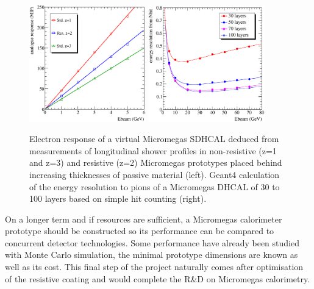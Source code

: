 \begin{figure}[hbp]
\begin{centering}
\includegraphics[width=0.45\textwidth]{Calorimeter/SDHCAL/splam_linearity}
\includegraphics[width=0.45\textwidth]{Calorimeter/SDHCAL/g4reso_sdhcal}
\caption{Electron response of a virtual Micromegas SDHCAL deduced from measurements of longitudinal shower profiles in non-resistive (z=1 and z=3) and resistive (z=2) Micromegas prototypes placed behind increasing thicknesses of passive material (left). Geant4 calculation of the energy resolution to pions of a Micromegas DHCAL of 30 to 100 layers based on simple hit counting (right).}
\label{future}
\end{centering}
\end{figure}

On a longer term and if resources are sufficient, a Micromegas calorimeter prototype should be constructed so its performance can be compared to concurrent detector technologies. Some performance have already been studied with Monte Carlo simulation, the minimal prototype dimensions are known as well as its cost. This final step of the project naturally comes after optimisation of the resistive coating and would complete the R\&D on Micromegas calorimetry.
